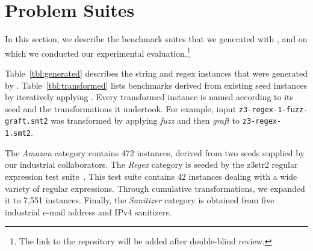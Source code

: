 \section{Problem Suites}
\label{sec:problems}

In this section, we describe the benchmark suites that we generated
with \fuzzer{}, and on which we conducted our experimental
evaluation.\footnote{The link to the repository will be added after
double-blind review.}

Table~\ref{tbl:generated} describes the string and regex instances that were
generated by \generator{}. Table~\ref{tbl:transformed} lists benchmarks
derived from existing seed instances by iteratively applying \transformer{}.
Every transformed instance is named according to its
seed and the transformations it undertook. For example, input
\texttt{z3-regex-1-fuzz-graft.smt2} was transformed by applying
\textit{fuzz} and then \textit{graft} to \texttt{z3-regex-1.smt2}.

The \textit{Amazon} category contains 472 instances, derived from two seeds
supplied by our industrial collaborators. The \textit{Regex} category is
seeded by the z3str2 regular expression test suite~\cite{z3str2-tests}. This
test suite contains 42 instances dealing with a wide variety of regular
expressions. Through cumulative transformations, we expanded it to 7,551
instances. Finally, the \textit{Sanitizer} category is obtained from
five industrial e-mail address and IPv4 sanitizers.

